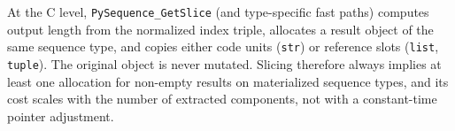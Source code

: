 At the C level, \texttt{PySequence\_GetSlice} (and type-specific fast paths) computes output length from the normalized index triple, allocates a result object of the same sequence type, and copies either code units (\texttt{str}) or reference slots (\texttt{list}, \texttt{tuple}). The original object is never mutated. Slicing therefore always implies at least one allocation for non-empty results on materialized sequence types, and its cost scales with the number of extracted components, not with a constant-time pointer adjustment.
